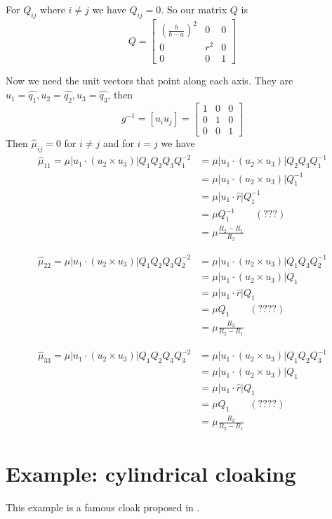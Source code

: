 \documentclass{amsart}
\begin{document}
For $Q_{ij}$ where $i\neq j$ we have $Q_{ij}=0$. So our matrix $Q$ is
\[
  Q=\begin{bmatrix}
    \left(\frac{b}{b-a}\right)^2 & 0 & 0\\
    0 & r^2 & 0\\
    0 & 0 & 1
  \end{bmatrix}
\]

Now we need the unit vectors that point along each axis. They are $u_1=\widehat{q_1},u_2=\widehat{q_2},u_3=\widehat{q_3}$,
then
\[
  g^{-1}=
  [u_iu_j]=
  \begin{bmatrix}
    1 & 0 & 0\\
    0 & 1 & 0\\
    0 & 0 & 1
  \end{bmatrix}
\]
Then $\hat{\mu}_{ij}=0$ for $i\neq j$ and for $i=j$ we have
\begin{align*}
  \hat{\mu}_{11}=\mu|u_1\cdot(u_2\times u_3)|Q_1Q_2Q_3Q_1^{-2}
  &=\mu|u_1\cdot(u_2\times u_3)|Q_2Q_3Q_1^{-1}\\
  &=\mu|u_1\cdot(u_2\times u_3)|Q_1^{-1}\\
  &=\mu|u_1\cdot\hat{r}|Q_1^{-1}\\
  &=\mu Q_1^{-1}\qquad (???)\\
  &=\mu \frac{R_2-R_1}{R_2}
\end{align*}

\begin{align*}
  \hat{\mu}_{22}=\mu|u_1\cdot(u_2\times u_3)|Q_1Q_2Q_3Q_2^{-2}
  &=\mu|u_1\cdot(u_2\times u_3)|Q_1Q_3Q_2^{-1}\\
  &=\mu|u_1\cdot(u_2\times u_3)|Q_1\\
  &=\mu|u_1\cdot\hat{r}|Q_1\\
  &=\mu Q_1\qquad (????)\\
  &=\mu \frac{R_2}{R_2-R_1}
\end{align*}

\begin{align*}
  \hat{\mu}_{33}=\mu|u_1\cdot(u_2\times u_3)|Q_1Q_2Q_3Q_3^{-2}
  &=\mu|u_1\cdot(u_2\times u_3)|Q_1Q_2Q_3^{-1}\\
  &=\mu|u_1\cdot(u_2\times u_3)|Q_1\\
  &=\mu|u_1\cdot\hat{r}|Q_1\\
  &=\mu Q_1\qquad (????)\\
  &=\mu \frac{R_2}{R_2-R_1}
\end{align*}


\section{Example: cylindrical cloaking}
This example is a famous cloak proposed in \cite{schurig06}.
\end{document}
